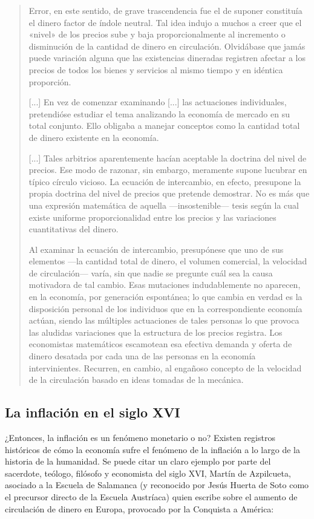 \documentclass[12pt,a4paper,twoside]{book}
\begin{document}
\begin{quotation}
Error, en este sentido, de grave trascendencia fue el de suponer constituía el dinero factor de índole neutral. Tal idea indujo a muchos a creer que el «nivel» de los precios sube y baja proporcionalmente al incremento o disminución de la cantidad de dinero en circulación. Olvidábase que jamás puede variación alguna que las existencias dineradas registren afectar a los precios de todos los bienes y servicios al mismo tiempo y en idéntica proporción. 

[...] En vez de comenzar examinando [...] las actuaciones individuales, pretendióse estudiar el tema analizando la economía de mercado en su total conjunto. Ello obligaba a manejar conceptos como la cantidad total de dinero existente en la economía.

[...] Tales arbitrios aparentemente hacían aceptable la doctrina del nivel de precios. Ese modo de razonar, sin embargo, meramente supone lucubrar en típico círculo vicioso. La ecuación de intercambio, en efecto, presupone la propia doctrina del nivel de precios que pretende demostrar. No es más que una expresión matemática de aquella —insostenible— tesis según la cual existe uniforme proporcionalidad entre los precios y las variaciones cuantitativas del dinero.

Al examinar la ecuación de intercambio, presupónese que uno de sus elementos —la cantidad total de dinero, el volumen comercial, la velocidad de circulación— varía, sin que nadie se pregunte cuál sea la causa motivadora de tal cambio. Esas mutaciones indudablemente no aparecen, en la economía, por generación espontánea; lo que cambia en verdad es la disposición personal de los individuos que en la correspondiente economía actúan, siendo las múltiples actuaciones de tales personas lo que provoca las aludidas variaciones que la estructura de los precios registra. Los economistas matemáticos escamotean esa efectiva demanda y oferta de dinero desatada por cada una de las personas en la economía intervinientes. Recurren, en cambio, al engañoso concepto de la velocidad de la circulación basado en ideas tomadas de la mecánica. \cite{krause:teomon}
\end{quotation}

\subsection{La inflación en el siglo XVI}
¿Entonces, la inflación es un fenómeno monetario o no? Existen registros históricos de cómo la economía sufre el fenómeno de la inflación a lo largo de la historia de la humanidad. Se puede citar un claro ejemplo por parte del sacerdote, teólogo, filósofo y economista del siglo XVI, Martín de Azpilcueta, asociado a la Escuela de Salamanca (y reconocido por Jesús Huerta de Soto como el precursor directo de la Escuela Austríaca) quien escribe sobre el aumento de circulación de dinero en Europa, provocado por la Conquista a América:
\end{document}
